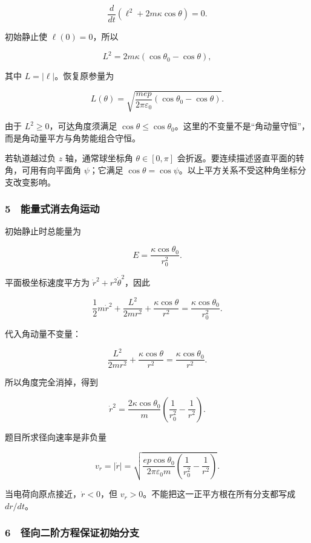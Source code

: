 \documentclass[12pt,a4paper,fontset=fandol]{ctexart}
\begin{document}
\[\frac{d}{dt}\left(\ell^2+2m\kappa\cos\theta\right)=0.\]

初始静止使 \(\ell(0)=0\)，所以

\[\boxed{L^2=2m\kappa(\cos\theta_0-\cos\theta),}\]

其中 \(L=|\ell|\)。恢复原参量为

\[\boxed{L(\theta)=
\sqrt{\frac{mep}{2\pi\varepsilon_0}
(\cos\theta_0-\cos\theta)}.}\]

由于 \(L^2\ge0\)，可达角度须满足
\(\cos\theta\le\cos\theta_0\)。这里的不变量不是``角动量守恒''，而是角动量平方与角势能组合守恒。

若轨道越过负 \(z\) 轴，通常球坐标角 \(\theta\in[0,\pi]\)
会折返。要连续描述竖直平面的转角，可用有向平面角 \(\psi\)；它满足
\(\cos\theta=\cos\psi\)。以上平方关系不受这种角坐标分支改变影响。

\subsubsection{5　能量式消去角运动}\label{ux80fdux91cfux5f0fux6d88ux53bbux89d2ux8fd0ux52a8}

初始静止时总能量为

\[E=\frac{\kappa\cos\theta_0}{r_0^2}.\]

平面极坐标速度平方为 \(\dot r^2+r^2\dot\theta^2\)，因此

\[\frac12m\dot r^2+\frac{L^2}{2mr^2}
+\frac{\kappa\cos\theta}{r^2}
=\frac{\kappa\cos\theta_0}{r_0^2}.\]

代入角动量不变量：

\[\frac{L^2}{2mr^2}+\frac{\kappa\cos\theta}{r^2}
=\frac{\kappa\cos\theta_0}{r^2}.\]

所以角度完全消掉，得到

\[\boxed{\dot r^2=\frac{2\kappa\cos\theta_0}{m}
\left(\frac1{r_0^2}-\frac1{r^2}\right).}\]

题目所求径向速率是非负量

\[\boxed{v_r=|\dot r|=
\sqrt{\frac{ep\cos\theta_0}{2\pi\varepsilon_0m}
\left(\frac1{r_0^2}-\frac1{r^2}\right)}.}\]

当电荷向原点接近，\(\dot r<0\)，但
\(v_r>0\)。不能把这一正平方根在所有分支都写成 \(dr/dt\)。

\subsubsection{6　径向二阶方程保证初始分支}\label{ux5f84ux5411ux4e8cux9636ux65b9ux7a0bux4fddux8bc1ux521dux59cbux5206ux652f}
\end{document}
